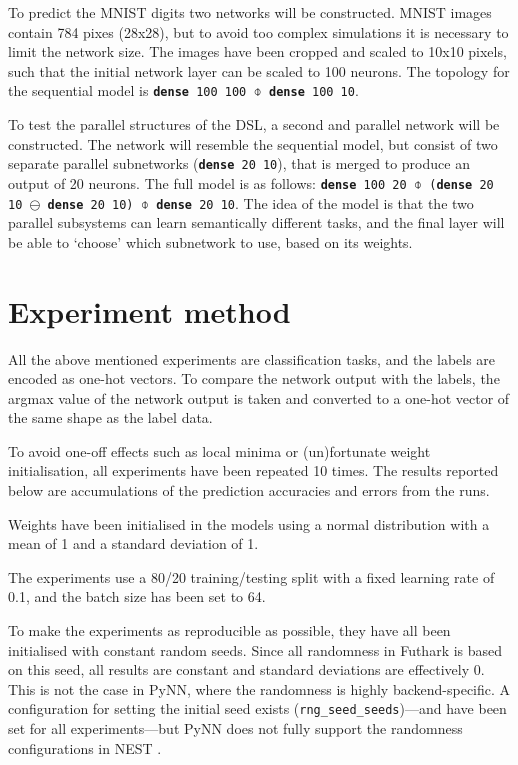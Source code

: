 \documentclass[report.tex]{subfiles}
\begin{document}
To predict the MNIST digits two networks will be constructed.
MNIST images contain 784 pixes (28x28), but to avoid too complex simulations
it is necessary to limit the network size.
The images have been cropped and scaled to 10x10 pixels, such that the initial
network layer can be scaled to 100 neurons.
The topology for the sequential model is \texttt{\textbf{dense} 100 100 $\obar$ \textbf{dense} 100 10}.

To test the parallel structures of the \gls{DSL}, a second and parallel network
will be constructed.
The network will resemble the sequential model, but consist of two separate
parallel subnetworks (\texttt{\textbf{dense} 20 10}), that is merged to produce
an output of 20 neurons.
The full model is as follows:
\texttt{\textbf{dense} 100 20 $\obar$ (\textbf{dense} 20 10 $\ominus$\
\textbf{dense} 20 10) $\obar$ \textbf{dense} 20 10}.
The idea of the model is that the two parallel subsystems can learn semantically
different tasks, and the final layer will be able to `choose' which subnetwork to
use, based on its weights.

\section{Experiment method}
All the above mentioned experiments are classification tasks, and the labels
are encoded as one-hot vectors.
To compare the network output with the labels, the argmax value of the network
output is taken and converted to a one-hot vector of the same shape as the label
data.

To avoid one-off effects such as local minima or (un)fortunate weight
initialisation, all experiments have been repeated 10 times.
The results reported below are accumulations of the prediction accuracies
and errors from the runs.

Weights have been initialised in the models using a normal distribution with a
mean of 1 and a standard deviation of 1.

The experiments use a 80/20 training/testing split with a fixed learning rate of
0.1, and the batch size has been set to 64.

To make the experiments as reproducible as possible, they have all been
initialised with constant random seeds.
Since all randomness in Futhark is based on this seed, all results are constant and
standard deviations are effectively 0.
This is not the case in PyNN, where the randomness is highly backend-specific.
A configuration for setting the initial seed exists
(\texttt{rng\_seed\_seeds})---and have been set for all experiments---but
PyNN does not fully support the randomness configurations in NEST
\cite{Gewaltig2007}.
\end{document}
